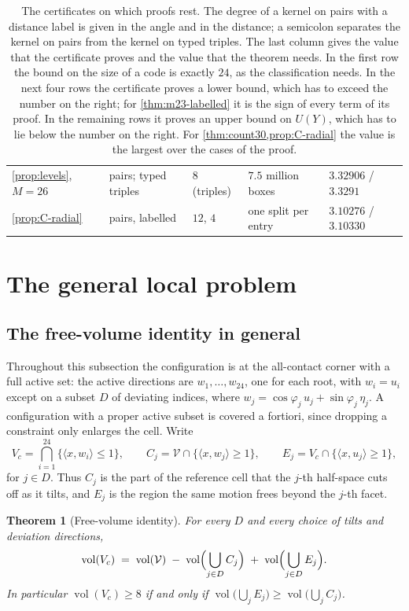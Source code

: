 \documentclass[11pt,reqno]{amsart}
\renewcommand{\_}{\origunderscore\allowbreak}
\numberwithin{equation}{section}
\theoremstyle{plain}
\newtheorem{thm}{Theorem}[section]
\theoremstyle{definition}
\theoremstyle{remark}
\newcommand{\VCell}{\mathcal{V}}             %
\newcommand{\tilt}{\varphi}                  %
\newcommand{\dev}{\eta}                      %
\newcommand{\base}{u}                        %
\DeclareMathOperator{\vol}{vol}
\begin{document}
\begin{table}[htbp]
\begin{tabular}{@{}lllll@{}}
\cref{prop:levels}, $M=26$ & pairs; typed triples & $8$ (triples) & $7.5$ million boxes & $3.32906$ / $3.3291$\\
\cref{prop:C-radial} & pairs, labelled & $12$, $4$ & one split per entry & $3.10276$ / $3.10330$\\
\bottomrule
\end{tabular}
\caption{The certificates on which proofs rest. The degree of a kernel on
pairs with a distance label is given in the angle and in the distance; a
semicolon separates the kernel on pairs from the kernel on typed triples.
The last column gives the value that the certificate proves and the value
that the theorem needs. In the first row the bound on the size of a code
is exactly $24$, as the classification needs. In the next four rows the
certificate proves a lower bound, which has to exceed the number on the
right; for \cref{thm:m23-labelled} it is the sign of every term of its
proof. In the remaining rows it proves an upper bound on $U(Y)$, which has
to lie below the number on the right.
For \cref{thm:count30,prop:C-radial} the value is the largest over the
cases of the proof.}
\label{tab:certificates}
\end{table}

\section{The general local problem}\label{sec:deviation-domain}

\subsection{The free-volume identity in general}

Throughout this subsection the configuration is at the all-contact
corner with a full active set: the active directions are
$w_1,\dots,w_{24}$, one for each root, with $w_i=\base_i$ except on a
subset $D$ of deviating indices, where $w_j=\cos\tilt_j\,\base_j+\sin\tilt_j\,\dev_j$.
A configuration with a proper active subset is covered a fortiori, since
dropping a constraint only enlarges the cell. Write
\[
  V_c=\bigcap_{i=1}^{24}\{\langle x,w_i\rangle\le1\},
  \qquad
  C_j=\VCell\cap\{\langle x,w_j\rangle\ge1\},
  \qquad
  E_j=V_c\cap\{\langle x,\base_j\rangle\ge1\},
\]
for $j\in D$. Thus $C_j$ is the part of the reference cell that the
$j$-th half-space cuts off as it tilts, and $E_j$ is the region the same
motion frees beyond the $j$-th facet.

\begin{thm}[Free-volume identity]\label{thm:freevol-new}
For every $D$ and every choice of tilts and deviation directions,
\begin{equation}\label{eq:freevol}
  \vol(V_c) \;=\; \vol(\VCell)
  \;-\;\vol\Bigl(\bigcup_{j\in D}C_j\Bigr)
  \;+\;\vol\Bigl(\bigcup_{j\in D}E_j\Bigr).
\end{equation}
In particular $\vol(V_c)\ge8$ if and only if
$\vol\bigl(\bigcup_{j}E_j\bigr)\ge\vol\bigl(\bigcup_{j}C_j\bigr)$.
\end{thm}
\end{document}
